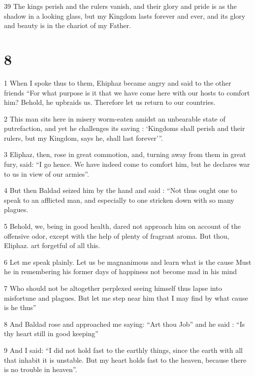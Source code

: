 \par 39 The kings perish and the rulers vanish, and their glory and pride is as the shadow in a looking glass, but my Kingdom lasts forever and ever, and its glory and beauty is in the chariot of my Father.

\chapter{8}

\par 1 When I spoke thus to them, Ehiphaz became angry and said to the other friends “For what purpose is it that we have come here with our hosts to comfort him? Behold, he upbraids us. Therefore let us return to our countries.

\par 2 This man sits here in misery worm-eaten amidst an unbearable state of putrefaction, and yet he challenges its saving : ‘Kingdoms shall perish and their rulers, but my Kingdom, says he, shall last forever’”.

\par 3 Eliphaz, then, rose in great commotion, and, turning away from them in great fury, said: “I go hence. We have indeed come to comfort him, but he declares war to us in view of our armies”.

\par 4 But then Baldad seized him by the hand and said : “Not thus ought one to speak to an afflicted man, and especially to one stricken down with so many plagues.

\par 5 Behold, we, being in good health, dared not approach him on account of the offensive odor, except with the help of plenty of fragrant aroma. But thou, Eliphaz. art forgetful of all this.

\par 6 Let me speak plainly. Let us be magnanimous and learn what is the cause Must he in remembering his former days of happiness not become mad in his mind

\par 7 Who should not be altogether perplexed seeing himself thus lapse into misfortune and plagues. But let me step near him that I may find by what cause is he thus”

\par 8 And Baldad rose and approached me saying: “Art thou Job” and he said : “Is thy heart still in good keeping”

\par 9 And I said: “I did not hold fast to the earthly things, since the earth with all that inhabit it is unstable. But my heart holds fast to the heaven, because there is no trouble in heaven”.


